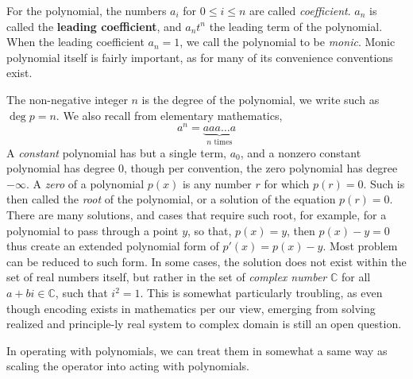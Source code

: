 For the polynomial, the numbers $a_{i}$ for $0\leq i \leq n$ are called \textit{coefficient}. $a_{n}$ is called the \textbf{leading coefficient}, and $a_{n}t^{n}$ the leading term of the polynomial. When the leading coefficient $a_{n}=1$, we call the polynomial to be \textit{monic}. Monic polynomial itself is fairly important, as for many of its convenience conventions exist. 

The non-negative integer $n$ is the degree of the polynomial, we write such as $\deg{p}=n$. We also recall from elementary mathematics, $$a^{n}=\underbrace{aaa\dots a}_{n\text{ times}}$$ 
A \textit{constant} polynomial has but a single term, $a_{0}$, and a nonzero constant polynomial has degree 0, though per convention, the zero polynomial has degree $-\infty$. A \textit{zero} of a polynomial $p(x)$ is any number $r$ for which $p(r)=0$. Such is then called the \textit{root}  of the polynomial, or a solution of the equation $p(r)=0$. There are many solutions, and cases that require such root, for example, for a polynomial to pass through a point $y$, so that, $p(x)=y$, then $p(x)-y=0$ thus create an extended polynomial form of $p'(x)=p(x)-y$. Most problem can be reduced to such form. In some cases, the solution does not exist within the set of real numbers itself, but rather in the set of \textit{complex number} $\mathbb{C}$ for all $a+bi \in \mathbb{C}$, such that $i^{2}=1$. This is somewhat particularly troubling, as even though encoding exists in mathematics per our view, emerging from solving realized and principle-ly real system to complex domain is still an open question. 

In operating with polynomials, we can treat them in somewhat a same way as scaling the operator into acting with polynomials. 

